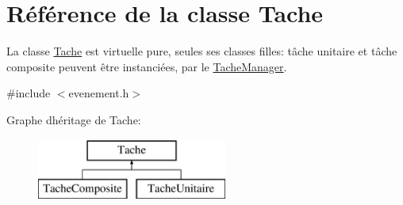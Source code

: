 \hypertarget{class_tache}{}\section{Référence de la classe Tache}
\label{class_tache}


La classe \hyperlink{class_tache}{Tache} est virtuelle pure, seules ses classes filles\+: tâche unitaire et tâche composite peuvent être instanciées, par le \hyperlink{class_tache_manager}{Tache\+Manager}.  




{\ttfamily \#include $<$evenement.\+h$>$}

Graphe d\textquotesingle{}héritage de Tache\+:\begin{figure}[H]
\begin{center}
\leavevmode
\includegraphics[height=2.000000cm]{class_tache}
\end{center}
\end{figure}
